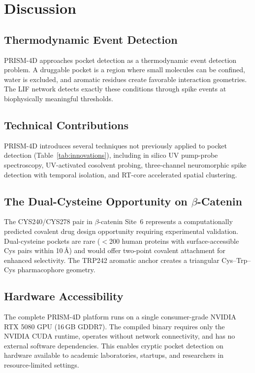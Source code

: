 \documentclass[11pt,twocolumn]{article}
\begin{document}
\section{Discussion}

\subsection{Thermodynamic Event Detection}

PRISM-4D approaches pocket detection as a thermodynamic event detection problem. A druggable
pocket is a region where small molecules can be confined, water is excluded, and aromatic
residues create favorable interaction geometries. The LIF network detects exactly these
conditions through spike events at biophysically meaningful thresholds.

\subsection{Technical Contributions}

PRISM-4D introduces several techniques not previously applied to pocket detection
(Table~\ref{tab:innovations}), including in silico UV pump-probe spectroscopy, UV-activated
cosolvent probing, three-channel neuromorphic spike detection with temporal isolation, and
RT-core accelerated spatial clustering.

\subsection{The Dual-Cysteine Opportunity on $\beta$-Catenin}

The CYS240/CYS278 pair in $\beta$-catenin Site~6 represents a computationally predicted
covalent drug design opportunity requiring experimental validation. Dual-cysteine pockets are
rare ($<$200 human proteins with surface-accessible Cys pairs within 10\,\AA{}) and would
offer two-point covalent attachment for enhanced selectivity. The TRP242 aromatic anchor
creates a triangular Cys--Trp--Cys pharmacophore geometry.

\subsection{Hardware Accessibility}

The complete PRISM-4D platform runs on a single consumer-grade NVIDIA RTX 5080 GPU
(16\,GB GDDR7). The compiled binary requires only the NVIDIA CUDA runtime, operates without
network connectivity, and has no external software dependencies. This enables cryptic pocket
detection on hardware available to academic laboratories, startups, and researchers in
resource-limited settings.
\end{document}
